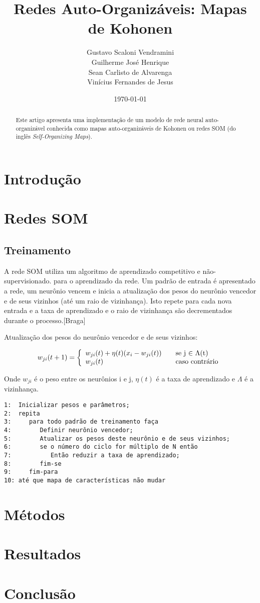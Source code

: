 \documentclass[a4paper]{article}
\title{Redes Auto-Organizáveis: Mapas de Kohonen}
\author{Gustavo Scaloni Vendramini    \\ 
        Guilherme José Henrique       \\
        Sean Carlisto de Alvarenga    \\
        Vinícius Fernandes de Jesus}
\date{\today}
\begin{document}
\maketitle

\begin{abstract}
Este artigo apresenta uma implementação de um modelo de rede neural auto-organizável conhecida como mapas auto-organizáveis de Kohonen ou redes SOM (do inglês \textit{Self-Organizing Maps}).
\end{abstract}

\section{Introdução}\label{introducao}

\section{Redes SOM}\label{som}

\subsection{Treinamento}\label{treinamento}
A rede SOM utiliza um algoritmo de aprendizado competitivo e não-supervisionado. para o aprendizado da rede. Um padrão de entrada é apresentado a rede, um neurônio vencem e inicia a atualização dos pesos do neurônio vencedor e de seus vizinhos (até um raio de vizinhança). Isto repete para cada nova entrada e a taxa de aprendizado e o raio de vizinhança são decrementados durante o processo.[Braga]

Atualização dos pesos do neurônio vencedor e de seus vizinhos:

\[ w_{ji}(t+1) = \left\{ 
  \begin{array}{l l}
    w_{ji}(t) + \eta(t)(x_{i}- w_{ji}(t)) & \quad \text{se j $\in$ $\Lambda$(t)}\\
    w_{ji}(t) & \quad \text{caso contrário}
  \end{array} \right.\]

Onde $w_{ji}$ é o peso entre os neurônios i e j, $\eta(t)$ é a taxa de aprendizado e $\Lambda$ é a vizinhança.

\begin{verbatim}
1:  Inicializar pesos e parâmetros;
2:  repita
3:     para todo padrão de treinamento faça
4:        Definir neurônio vencedor;
5:        Atualizar os pesos deste neurônio e de seus vizinhos;
6:        se o número do ciclo for múltiplo de N então
7:           Então reduzir a taxa de aprendizado;
8:        fim-se
9:     fim-para
10: até que mapa de características não mudar
\end{verbatim}

\section{Métodos}\label{metodos}


\section{Resultados}\label{resultados}


\section{Conclusão}\label{conclusao}




\end{document}
